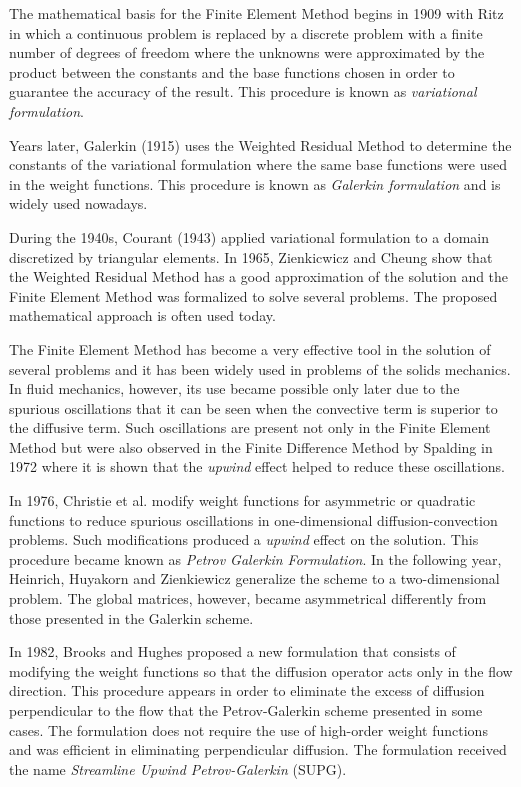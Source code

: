 The mathematical basis for the Finite Element Method begins in 1909
 with Ritz \cite{ritz1909} in which a continuous problem is replaced by 
a discrete problem with a finite number of degrees of freedom
 where the unknowns were approximated by the product between
 the constants and the base functions chosen
 in order to guarantee the accuracy of the result.
 This procedure is known as \textit{variational formulation}.

\medskip
 Years later, Galerkin (1915) \cite{galerkin1915} uses the Weighted Residual Method
 to determine the constants of the variational formulation
 where the same base functions were used in the weight functions.
 This procedure is known as \textit{Galerkin formulation} and
 is widely used nowadays.

\medskip
During the 1940s, Courant (1943) \cite{courant1943} applied
 variational formulation to a domain discretized by triangular elements.
 In 1965, Zienkicwicz and Cheung \cite{zienkiewicz1965}
 show that the Weighted Residual Method has a good approximation
 of the solution and the Finite Element Method was formalized
 to solve several problems. The proposed mathematical approach
 is often used today.

\medskip
The Finite Element Method has become a very effective tool
 in the solution of several problems and it has been widely
 used in problems of the solids mechanics.
 In fluid mechanics, however, its use became possible only
 later due to the spurious oscillations that it can be seen
 when the convective term is superior to the diffusive term.
 Such oscillations are present not only in the Finite Element Method
 but were also observed in the Finite Difference Method by
 Spalding in 1972 \cite{spalding1972} where it is shown that
 the \textit{upwind} effect helped to reduce these oscillations.

\medskip
In 1976, Christie et al. \cite{christie1976} modify weight
 functions for asymmetric or quadratic functions to reduce
 spurious oscillations in one-dimensional diffusion-convection problems.
 Such modifications produced a \textit{upwind} effect on the solution.
 This procedure became known as \textit{Petrov Galerkin Formulation}.
 In the following year, Heinrich, Huyakorn and Zienkiewicz
 \cite{heinrich1977} generalize the scheme to a two-dimensional problem.
 The global matrices, however, became asymmetrical differently
 from those presented in the Galerkin scheme.

\medskip
In 1982, Brooks and Hughes \cite{brooks1982} proposed a
 new formulation that consists of modifying the weight functions
 so that the diffusion operator acts only in the flow direction.
 This procedure appears in order to eliminate the excess of
 diffusion perpendicular to the flow that
 the Petrov-Galerkin scheme presented in some cases.
 The formulation does not require the use of high-order
 weight functions and was efficient in eliminating perpendicular
 diffusion. The formulation received the name
 \textit{Streamline Upwind Petrov-Galerkin} (SUPG).


